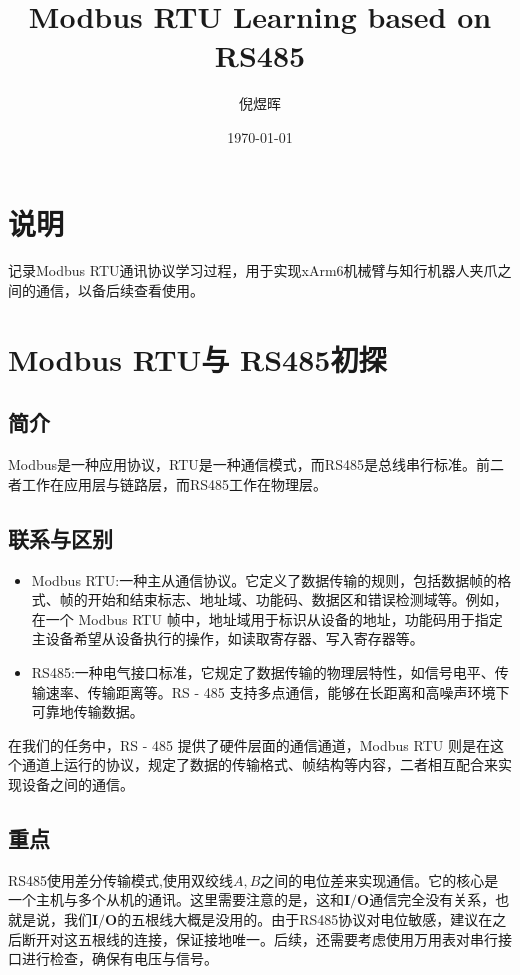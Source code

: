 \documentclass[UTF8]{ctexart}
\title{Modbus RTU Learning based on RS485}
\author{倪煜晖}
\date{\today}
\begin{document}
\maketitle

\tableofcontents

\section{说明}
记录Modbus RTU通讯协议学习过程，用于实现xArm6机械臂与知行机器人夹爪之间的通信，以备后续查看使用。

\section{Modbus RTU与 RS485初探}

\subsection{简介}
Modbus是一种应用协议，RTU是一种通信模式，而RS485是总线串行标准。前二者工作在应用层与链路层，而RS485工作在物理层。

\subsection{联系与区别}
\begin{itemize}
    \item Modbus RTU:一种主从通信协议。它定义了数据传输的规则，包括数据帧的格式、帧的开始和结束标志、地址域、功能码、数据区和错误检测域等。例如，在一个 Modbus RTU 帧中，地址域用于标识从设备的地址，功能码用于指定主设备希望从设备执行的操作，如读取寄存器、写入寄存器等。
    \item RS485:一种电气接口标准，它规定了数据传输的物理层特性，如信号电平、传输速率、传输距离等。RS - 485 支持多点通信，能够在长距离和高噪声环境下可靠地传输数据。
\end{itemize}

在我们的任务中，RS - 485 提供了硬件层面的通信通道，Modbus RTU 则是在这个通道上运行的协议，规定了数据的传输格式、帧结构等内容，二者相互配合来实现设备之间的通信。

\subsection{重点}
RS485使用差分传输模式,使用双绞线$A,B$之间的电位差来实现通信。它的核心是一个主机与多个从机的通讯。这里需要注意的是，这和$\textbf{I/O}$通信完全没有关系，也就是说，我们$\textbf{I/O}$的五根线大概是没用的。由于RS485协议对电位敏感，建议在之后断开对这五根线的连接，保证接地唯一。后续，还需要考虑使用万用表对串行接口进行检查，确保有电压与信号。
\end{document}
